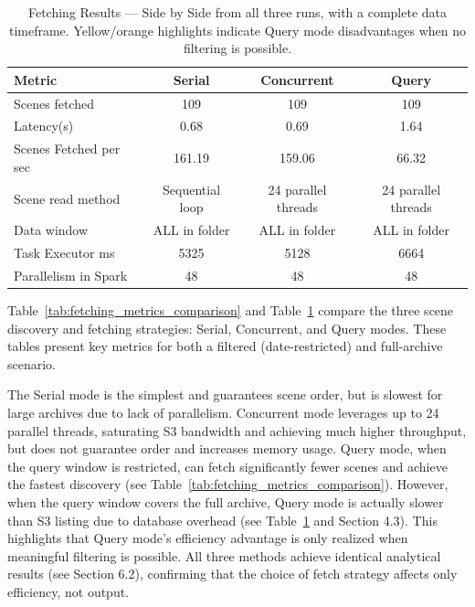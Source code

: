 \begin{table}[H]
\centering
\small
\begin{tabular}{|l|c|c|c|}
\hline
\textbf{Metric} & \textbf{Serial} & \textbf{Concurrent} & \textbf{Query} \\
\hline
Scenes fetched & 109 & 109 & 109 \\
Latency(s) & 0.68 & 0.69 & 1.64 \\
Scenes Fetched per sec & 161.19 & 159.06 & 66.32 \\
Scene read method & Sequential loop & 24 parallel threads & 24 parallel threads \\
Data window & ALL in folder & ALL in folder & ALL in folder \\
Task Executor ms & 5325 & 5128 & 6664 \\
Parallelism in Spark & 48 & 48 & 48 \\
\hline
\end{tabular}
\caption{Fetching Results --- Side by Side from all three runs, with a complete data timeframe. Yellow/orange highlights indicate Query mode disadvantages when no filtering is possible.}
\label{tab:fetching_results_full_timeframe}
\end{table}
\label{sec:scene_fetch_comparison}

\label{sec:scene_fetch_comparison}

Table~\ref{tab:fetching_metrics_comparison} and Table~\ref{tab:fetching_results_full_timeframe} compare the three scene discovery and fetching strategies: Serial, Concurrent, and Query modes. These tables present key metrics for both a filtered (date-restricted) and full-archive scenario.

The Serial mode is the simplest and guarantees scene order, but is slowest for large archives due to lack of parallelism. Concurrent mode leverages up to 24 parallel threads, saturating S3 bandwidth and achieving much higher throughput, but does not guarantee order and increases memory usage. Query mode, when the query window is restricted, can fetch significantly fewer scenes and achieve the fastest discovery (see Table~\ref{tab:fetching_metrics_comparison}). However, when the query window covers the full archive, Query mode is actually slower than S3 listing due to database overhead (see Table~\ref{tab:fetching_results_full_timeframe} and Section 4.3). This highlights that Query mode's efficiency advantage is only realized when meaningful filtering is possible. All three methods achieve identical analytical results (see Section 6.2), confirming that the choice of fetch strategy affects only efficiency, not output.


